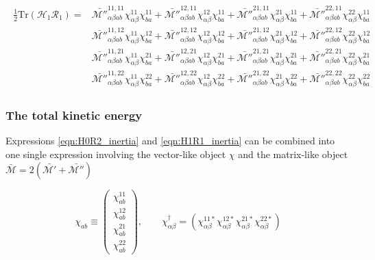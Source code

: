 \begin{tcolorbox}
\begin{align}\label{eqn:H1R1_inertia}
\begin{aligned}
\frac{1}{2}\mathrm{Tr}\left(\mathcal{H}_1\mathcal{R}_1\right) = &
 \mathcal{\bar{M''}}^{11,11}_{\alpha\beta ab}\chi^{11}_{\alpha\beta}\chi^{11}_{ba} +
 \mathcal{\bar{M''}}^{12,11}_{\alpha\beta ab}\chi^{12}_{\alpha\beta}\chi^{11}_{ba} +
 \mathcal{\bar{M''}}^{21,11}_{\alpha\beta ab}\chi^{21}_{\alpha\beta}\chi^{11}_{ba} +
 \mathcal{\bar{M''}}^{22,11}_{\alpha\beta ab}\chi^{22}_{\alpha\beta}\chi^{11}_{ba} \\
&
 \mathcal{\bar{M''}}^{11,12}_{\alpha\beta ab}\chi^{11}_{\alpha\beta}\chi^{12}_{ba} +
 \mathcal{\bar{M''}}^{12,12}_{\alpha\beta ab}\chi^{12}_{\alpha\beta}\chi^{12}_{ba} +
 \mathcal{\bar{M''}}^{21,12}_{\alpha\beta ab}\chi^{21}_{\alpha\beta}\chi^{12}_{ba} +
 \mathcal{\bar{M''}}^{22,12}_{\alpha\beta ab}\chi^{22}_{\alpha\beta}\chi^{12}_{ba} \\
&
 \mathcal{\bar{M''}}^{11,21}_{\alpha\beta ab}\chi^{11}_{\alpha\beta}\chi^{21}_{ba} +
 \mathcal{\bar{M''}}^{12,21}_{\alpha\beta ab}\chi^{12}_{\alpha\beta}\chi^{21}_{ba} +
 \mathcal{\bar{M''}}^{21,21}_{\alpha\beta ab}\chi^{21}_{\alpha\beta}\chi^{21}_{ba} +
 \mathcal{\bar{M''}}^{22,21}_{\alpha\beta ab}\chi^{22}_{\alpha\beta}\chi^{21}_{ba} \\
&
 \mathcal{\bar{M''}}^{11,22}_{\alpha\beta ab}\chi^{11}_{\alpha\beta}\chi^{22}_{ba} +
 \mathcal{\bar{M''}}^{12,22}_{\alpha\beta ab}\chi^{12}_{\alpha\beta}\chi^{22}_{ba} +
 \mathcal{\bar{M''}}^{21,22}_{\alpha\beta ab}\chi^{21}_{\alpha\beta}\chi^{22}_{ba} +
 \mathcal{\bar{M''}}^{22,22}_{\alpha\beta ab}\chi^{22}_{\alpha\beta}\chi^{22}_{ba}
\end{aligned}
\end{align}
\end{tcolorbox}

\subsubsection{The total kinetic energy}

Expressions \ref{eqn:H0R2_inertia} and \ref{eqn:H1R1_inertia} can be combined into one single expression involving the vector-like object $\chi$ and the matrix-like object $\mathcal{\bar{M}}=2(\mathcal{\bar{M'}+\bar{M''}})$

\begin{equation*}
\chi_{ab} \equiv \left(\begin{array}{c}
\chi_{ab}^{11}\\
\chi_{ab}^{12}\\
\chi_{ab}^{21}\\
\chi_{ab}^{22}
\end{array}\right), \qquad
\chi^\dagger_{\alpha\beta} = \left(\chi_{\alpha\beta}^{11*} \chi_{\alpha\beta}^{12*} \chi_{\alpha\beta}^{21*} \chi_{\alpha\beta}^{22*} \right)
\end{equation*}

